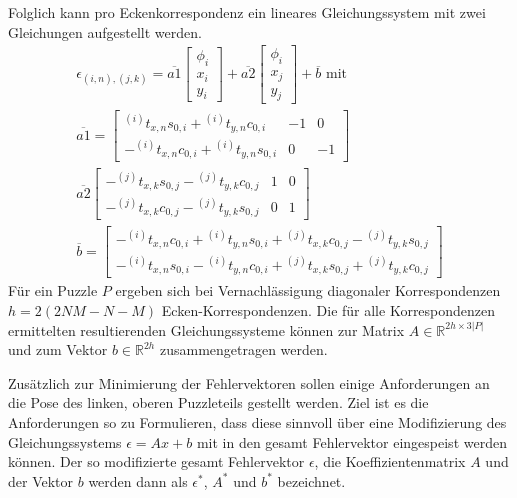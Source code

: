 Folglich kann pro Eckenkorrespondenz ein lineares Gleichungssystem mit zwei Gleichungen aufgestellt werden. 
\begin{gather}
    \epsilon_{(i,n),(j,k)} = 
    \overline{a1} \begin{bmatrix}
        \phi_{i}\\
        x_i\\
        y_i
    \end{bmatrix}
    + \overline{a2} \begin{bmatrix}
        \phi_{i}\\
        x_j\\
        y_j
    \end{bmatrix}
    + \overline{b}\text{ mit }\\
    \overline{a1} = \begin{bmatrix}
        {}^{(i)}t_{x,n} s_{0,i} + {}^{(i)}t_{y,n} c_{0,i} & -1 & 0\\
        -{}^{(i)}t_{x,n} c_{0,i} + {}^{(i)}t_{y,n} s_{0,i} & 0 & -1
    \end{bmatrix}\nonumber\\
    \overline{a2}\begin{bmatrix}
        -{}^{(j)}t_{x,k} s_{0,j} - {}^{(j)}t_{y,k} c_{0,j} & 1 & 0\\
        -{}^{(j)}t_{x,k} c_{0,j} - {}^{(j)}t_{y,k} s_{0,j} & 0 & 1
    \end{bmatrix}\nonumber\\
    \overline{b} = \begin{bmatrix}
        -{}^{(i)}t_{x,n} c_{0,i} + {}^{(i)}t_{y,n} s_{0,i} + {}^{(j)}t_{x,k} c_{0,j} - {}^{(j)}t_{y,k} s_{0,j}\\
        -{}^{(i)}t_{x,n} s_{0,i} - {}^{(i)}t_{y,n} c_{0,i} +{}^{(j)}t_{x,k} s_{0,j} + {}^{(j)}t_{y,k} c_{0,j}
    \end{bmatrix}\nonumber
\end{gather}
Für ein Puzzle $P$ ergeben sich bei Vernachlässigung diagonaler Korrespondenzen $h = 2(2NM-N-M)$ Ecken-Korrespondenzen. Die für alle Korrespondenzen ermittelten resultierenden Gleichungssysteme können zur Matrix $A \in \mathbb{R}^{2h\times3|P|}$ und zum Vektor $b \in \mathbb{R}^{2h}$ zusammengetragen werden.

Zusätzlich zur Minimierung der Fehlervektoren sollen einige Anforderungen an die Pose des linken, oberen Puzzleteils gestellt werden. Ziel ist es die Anforderungen so zu Formulieren, dass diese sinnvoll über eine Modifizierung des Gleichungssystems $\epsilon = Ax+b$ mit in den gesamt Fehlervektor eingespeist werden können. Der so modifizierte gesamt Fehlervektor $\epsilon$, die Koeffizientenmatrix $A$ und der Vektor $b$ werden dann als $\epsilon^*$, $A^*$ und $b^*$ bezeichnet.

